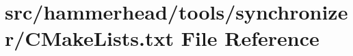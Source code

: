 \hypertarget{tools_2synchronizer_2CMakeLists_8txt}{}\section{src/hammerhead/tools/synchronizer/\+C\+Make\+Lists.txt File Reference}
\label{tools_2synchronizer_2CMakeLists_8txt}
